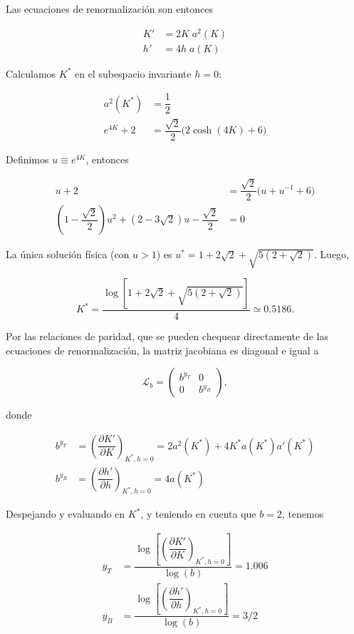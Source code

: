 \documentclass[10pt]{article}
\begin{document}
Las ecuaciones de renormalizaci\'on son entonces

\begin{align}
K' &= 2K\;a^2(K) \\
h' &= 4h\;a(K) 
\end{align}

Calculamos $K^*$ en el subespacio invariante $h=0$:

\begin{align}
a^2(K^*) &= \dfrac{1}{2} \\
e^{4K} + 2 &= \dfrac{\sqrt{2}}{2} \bigg( 2\cosh(4K) + 6 \bigg)
\end{align}

Definimos $u \equiv e^{4K}$, entonces

\begin{align}
u + 2 &= \dfrac{\sqrt{2}}{2} \bigg( u + u^{-1} + 6 \bigg) \\
\left(1 - \dfrac{\sqrt{2}}{2}\right) u^2 + \left(2 - 3\sqrt{2}\right) u - \dfrac{\sqrt{2}}{2}&= 0
\end{align}

La \'unica soluci\'on f\'isica (con $u>1$) es $u^* = 1+2\sqrt{2}+\sqrt{5(2+\sqrt{2})}$. Luego, 

\begin{equation}
K^* = \dfrac{\log{\left[1+2\sqrt{2}+\sqrt{5(2+\sqrt{2})}\right]}}{4} \simeq 0.5186.
\end{equation}

Por las relaciones de paridad, que se pueden chequear directamente de las ecuaciones de renormalizaci\'on, la matriz jacobiana es diagonal e igual a 

$$
\mathcal{L}_b = 
\begin{pmatrix}
b^{y_T} & 0 \\
0 & b^{y_B}
\end{pmatrix},
$$

donde

\begin{align}
b^{y_T} &= \left( \dfrac{\partial K'}{\partial K} \right)_{K^{*},h=0} = 2a^2(K^*)+4K^*a(K^*) a'(K^*) \\
b^{y_B} &= \left( \dfrac{\partial h'}{\partial h} \right)_{K^{*},h=0} = 4a(K^*)
\end{align}

Despejando y evaluando en $K^*$, y teniendo en cuenta que $b=2$, tenemos

\begin{align}
y_T &= \dfrac{\log\left[ \left( \dfrac{\partial K'}{\partial K}  \right)_{K^{*},h=0} \right]}{\log(b)} = 1.006 \\
y_B &= \dfrac{\log\left[ \left( \dfrac{\partial h'}{\partial h}  \right)_{K^{*},h=0} \right]}{\log(b)} = 3/2
\end{align}
\end{document}
